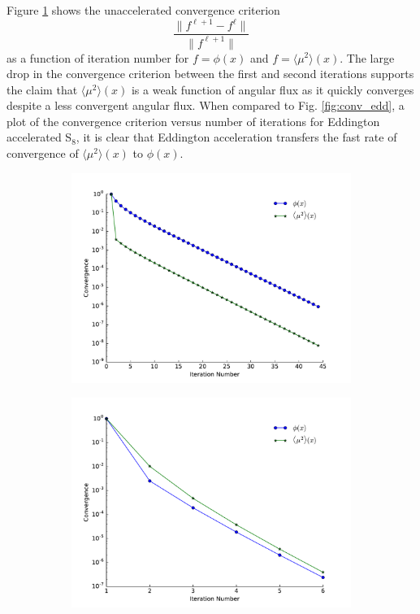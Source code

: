 \documentclass[11 pt]{article}
\newcommand{\edd}{\langle \mu^2 \rangle}
\begin{document}
	Figure \ref{fig:conv_si} shows the unaccelerated convergence criterion 
		\begin{equation}
			\frac{\|f^{\ell+1} - f^{\ell}\|}{\|f^{\ell+1}\|}
		\end{equation}
	as a function of iteration number for $f = \phi(x)$ and $f = \edd(x)$. The large drop in the convergence criterion between the first and second iterations supports the claim that $\edd(x)$ is a weak function of angular flux as it quickly converges despite a less convergent angular flux. When compared to Fig. \ref{fig:conv_edd}, a plot of the convergence criterion versus number of iterations for Eddington accelerated S$_8$, it is clear that Eddington acceleration transfers the fast rate of convergence of $\edd(x)$ to $\phi(x)$. 

	\begin{figure}
		\centering
		\begin{subfigure}{.49\textwidth} 
			\centering
			\includegraphics[width=\textwidth]{eddCon_si.pdf}
			\caption{}
			\label{fig:conv_si}
		\end{subfigure}
		\begin{subfigure}{.49\textwidth}
			\centering
			\includegraphics[width=\textwidth]{eddCon_mu.pdf}

\end{subfigure}
\end{figure}
\end{document}
